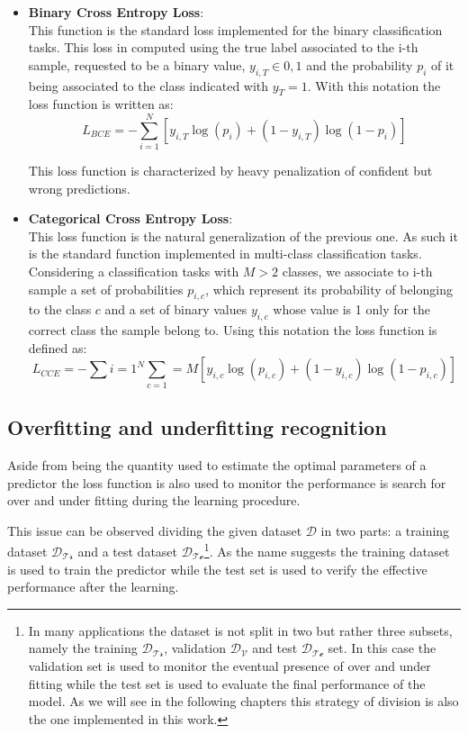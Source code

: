 \begin{itemize}
\item \textbf{Binary Cross Entropy Loss}:\\
    This function is the standard loss implemented for the binary classification tasks. This loss in computed using the true label associated to the i-th sample, requested to be a binary value, $y_{i,T}\in{0,1}$ and the probability $p_{i}$ of it being associated to the class indicated with $y_{T}=1$. With this notation the loss function is written as:
    \begin{equation}
        L_{BCE}= -\sum_{i=1}^N\left[ y_{i,T}\log(p_i)+
        \left(1- y_{i,T}\right)\log(1-p_i)\right]
    \end{equation}
    
    This loss function is characterized by heavy penalization of confident but wrong predictions. 

\item \textbf{Categorical Cross Entropy Loss}:\\
    This loss function is the natural generalization of the previous one. As such it is the standard function implemented in multi-class classification tasks. Considering a classification tasks with $M>2$ classes, we associate to i-th sample a set of probabilities $p_{i,c}$, which represent its probability of belonging to the class $c$ and a set of binary values $y_{i,c}$ whose value is 1 only for the correct class the sample belong to. Using this notation the loss function is defined as:
    \begin{equation}
        L_{CCE} = -\sum{i=1}^N \sum_{c=1}=M  \left[
        y_{i,c}\log(p_{i,c}) + (1-y_{i,c})\log(1-p_{i,c})
        \right]
    \end{equation}
    
\end{itemize}


\subsection{Overfitting and underfitting recognition} \label{fit_over_under}

Aside from being the quantity used to estimate the optimal parameters of a predictor the loss function is also used to monitor the performance is search for over and under fitting during the learning procedure. 

This issue can be observed dividing the given dataset $\mathcal{D}$ in two parts: a training dataset $\mathcal{D_{Tr}}$ and a test dataset $\mathcal{D_{Te}}$\footnote{In many applications the dataset is not split in two but rather three subsets, namely the training $\mathcal{D_{Tr}}$, validation $\mathcal{D_{V}}$ and test $\mathcal{D_{Te}}$ set. In this case the validation set is used to monitor the eventual presence of over and under fitting while the test set is used to evaluate the final performance of the model. As we will see in the following chapters this strategy of division is also the one implemented in this work.}. As the name suggests the training dataset is used to train the predictor while the test set is used to verify the effective performance after the learning.

